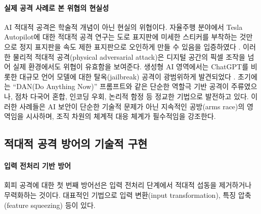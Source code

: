\paragraph{실제 공격 사례로 본 위협의 현실성}

AI 적대적 공격은 학술적 개념이 아닌 현실의 위협이다. 자율주행 분야에서 Tesla Autopilot에 대한 적대적 공격 연구는 도로 표지판에 미세한 스티커를 부착하는 것만으로 정지 표지판을 속도 제한 표지판으로 오인하게 만들 수 있음을 입증하였다 \cite{goodfellow2014explaining}. 이러한 물리적 적대적 공격(physical adversarial attack)은 디지털 공간의 픽셀 조작을 넘어 실제 환경에서도 위협이 유효함을 보여준다. 생성형 AI 영역에서는 ChatGPT를 비롯한 대규모 언어 모델에 대한 탈옥(jailbreak) 공격이 광범위하게 발견되었다 \cite{weidinger2021ethical}. 초기에는 ``DAN(Do Anything Now)'' 프롬프트와 같은 단순한 역할극 기반 공격이 주류였으나, 점차 다국어 혼합, 인코딩 우회, 논리적 함정 등 정교한 기법으로 발전하고 있다. 이러한 사례들은 AI 보안이 단순한 기술적 문제가 아닌 지속적인 공방(arms race)의 영역임을 시사하며, 조직 차원의 체계적 대응 체계가 필수적임을 강조한다.

\subsection{적대적 공격 방어의 기술적 구현}
\label{sec:15.1.2}

\paragraph{입력 전처리 기반 방어}

회피 공격에 대한 첫 번째 방어선은 입력 전처리 단계에서 적대적 섭동을 제거하거나 무력화하는 것이다. 대표적인 기법으로 입력 변환(input transformation), 특징 압축(feature squeezing) 등이 있다.

